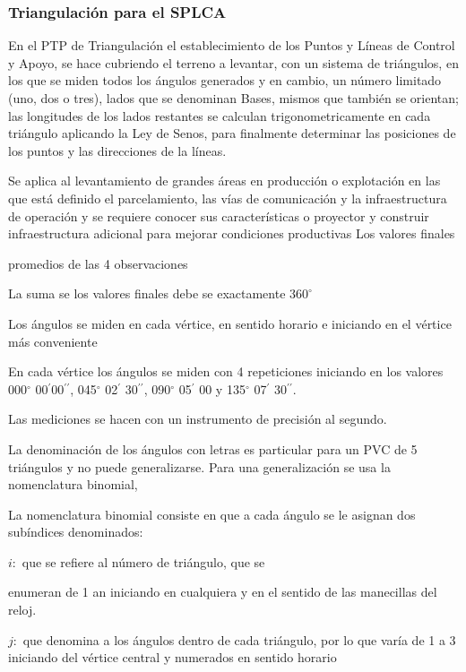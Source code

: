 \subsubsection{Triangulación para el SPLCA}

En el PTP de Triangulación el establecimiento de los Puntos y Líneas de Control y Apoyo, se hace cubriendo el terreno a levantar, con un sistema de triángulos, en los que se miden todos los ángulos generados y en cambio, un número limitado (uno, dos o tres), lados que se denominan Bases, mismos que también se orientan; las longitudes de los lados restantes se calculan trigonometricamente en cada triángulo aplicando la Ley de Senos, para finalmente determinar las posiciones de los puntos y las direcciones de la líneas.

Se aplica al levantamiento de grandes áreas en producción o explotación en las que está definido el parcelamiento, las vías de comunicación y la infraestructura de operación y se requiere conocer sus características o proyector y construir infraestructura adicional para mejorar condiciones productivas
Los valores finales

promedios de las 4 observaciones

La suma se los valores finales debe se exactamente $360^{\circ}$

Los ángulos se miden en cada vértice, en sentido horario e iniciando en el vértice más conveniente

En cada vértice los ángulos se miden con 4 repeticiones iniciando en los valores 000$^{\circ}$ 00$^{\prime}$00$^{\prime\prime}$, 045$^{\circ}$ 02$^{\prime}$ 30$^{\prime\prime}$, 090$^{\circ}$ 05$^{\prime}$ 00 y 135$^{\circ}$ 07$^{\prime}$ 30$^{\prime\prime}$.

Las mediciones se hacen con un instrumento de precisión al segundo.

La denominación de los ángulos con letras es particular para un PVC de 5 triángulos y no puede generalizarse. Para una generalización se usa la nomenclatura binomial,

La nomenclatura binomial consiste en que a cada ángulo se le asignan dos subíndices denominados:

$i:$ que se refiere al número de triángulo, que se

enumeran de 1 an iniciando en cualquiera y en el sentido de las manecillas del reloj.

$j:$ que denomina a los ángulos dentro de cada triángulo, por lo que varía de 1 a 3 iniciando del vértice central y numerados en sentido horario

